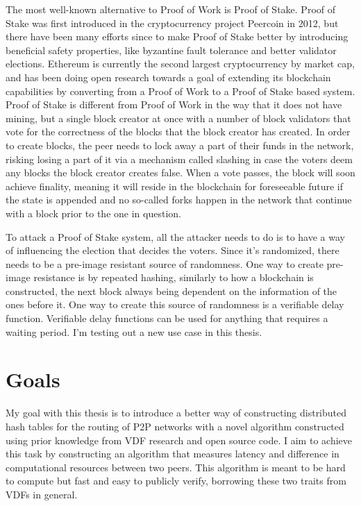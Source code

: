 \documentclass[a4paper,12pt]{article}
\begin{document}
The most well-known alternative to Proof of Work is Proof of Stake. Proof of Stake was first introduced in the cryptocurrency project Peercoin in 2012, but there have been many efforts since to make Proof of Stake better by introducing beneficial safety properties, like byzantine fault tolerance and better validator elections. Ethereum is currently the second largest cryptocurrency by market cap, and has been doing open research towards a goal of extending its blockchain capabilities by converting from a Proof of Work to a Proof of Stake based system. Proof of Stake is different from Proof of Work in the way that it does not have mining, but a single block creator at once with a number of block validators that vote for the correctness of the blocks that the block creator has created. In order to create blocks, the peer needs to lock away a part of their funds in the network, risking losing a part of it via a mechanism called slashing in case the voters deem any blocks the block creator creates false. When a vote passes, the block will soon achieve finality, meaning it will reside in the blockchain for foreseeable future if the state is appended and no so-called forks happen in the network that continue with a block prior to the one in question.

To attack a Proof of Stake system, all the attacker needs to do is to have a way of influencing the election that decides the voters. Since it's randomized, there needs to be a pre-image resistant source of randomness. One way to create pre-image resistance is by repeated hashing, similarly to how a blockchain is constructed, the next block always being dependent on the information of the ones before it. One way to create this source of randomness is a verifiable delay function. Verifiable delay functions can be used for anything that requires a waiting period. I'm testing out a new use case in this thesis.

\section{Goals}
My goal with this thesis is to introduce a better way of constructing distributed hash tables for the routing of P2P networks with a novel algorithm constructed using prior knowledge from VDF research and open source code. I aim to achieve this task by constructing an algorithm that measures latency and difference in computational resources between two peers. This algorithm is meant to be hard to compute but fast and easy to publicly verify, borrowing these two traits from VDFs in general.
\end{document}
